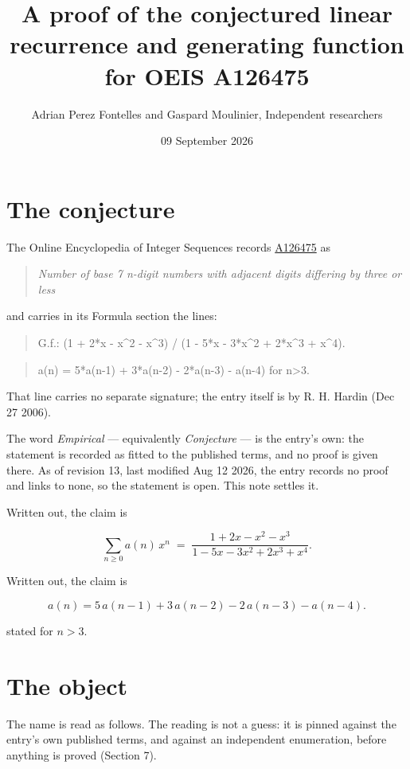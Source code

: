\documentclass[11pt]{article}
\title{A proof of the conjectured linear recurrence and generating function for OEIS A126475}
\author{Adrian Perez Fontelles and Gaspard Moulinier, Independent researchers}
\date{09 September 2026}
\theoremstyle{definition}
\begin{document}
\maketitle
\section{The conjecture}

The Online Encyclopedia of Integer Sequences records \href{https://oeis.org/A126475}{A126475} as

\begin{quote}\itshape Number of base 7 n-digit numbers with adjacent digits differing by three or less\end{quote}

and carries in its Formula section the lines:

\begin{quote}\ttfamily G.f.: (1 + 2*x - x\textasciicircum{}2 - x\textasciicircum{}3) / (1 - 5*x - 3*x\textasciicircum{}2 + 2*x\textasciicircum{}3 + x\textasciicircum{}4).\end{quote}

\begin{quote}\ttfamily a(n) = 5*a(n-1) + 3*a(n-2) - 2*a(n-3) - a(n-4) for n>3.\end{quote}

That line carries no separate signature; the entry itself is by R. H. Hardin (Dec 27 2006).

The word {\itshape Empirical} --- equivalently {\itshape Conjecture} --- is the entry's own: the statement is recorded as fitted to the published terms, and no proof is given there. As of revision 13, last modified Aug 12 2026, the entry records no proof and links to none, so the statement is open. This note settles it.

Written out, the claim is

\[\sum_{n \ge 0} a(n)\,x^n \;=\; \frac{1 + 2x - x^{2} - x^{3}}{1 - 5x - 3x^{2} + 2x^{3} + x^{4}}.\]

Written out, the claim is

\[a(n) = 5\,a(n-1) + 3\,a(n-2) - 2\,a(n-3) - a(n-4).\]

stated for $n > 3$.

\section{The object}

The name is read as follows. The reading is not a guess: it is pinned against the entry's own published terms, and against an independent enumeration, before anything is proved (Section 7).
\end{document}
